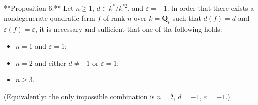 **Proposition 6.** Let $n \geq 1$, $d \in k^*/k^{*2}$, and $\varepsilon = \pm 1$. In order that there exists a nondegenerate quadratic form $f$ of rank $n$ over $k = \mathbf{Q}_p$ such that $d(f) = d$ and $\varepsilon(f) = \varepsilon$, it is necessary and sufficient that one of the following holds:

\begin{itemize}
\item[(i)] $n = 1$ and $\varepsilon = 1$;
\item[(ii)] $n = 2$ and either $d \neq -1$ or $\varepsilon = 1$;
\item[(iii)] $n \geq 3$.
\end{itemize}

(Equivalently: the only impossible combination is $n = 2$, $d = -1$, $\varepsilon = -1$.)
